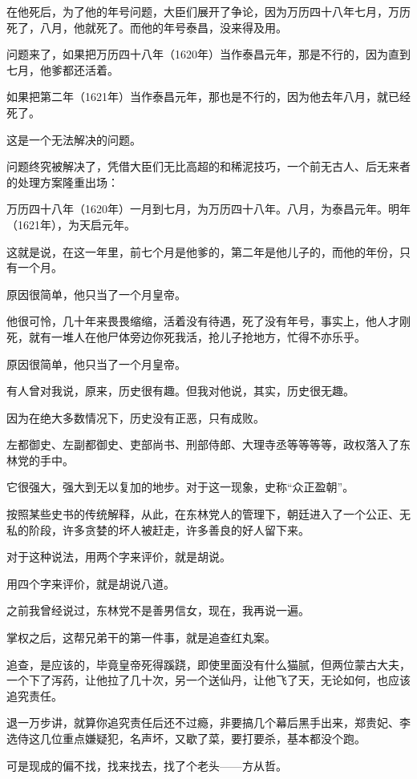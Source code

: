 \begin{multicols}{\theparacolNo}
在他死后，为了他的年号问题，大臣们展开了争论，因为万历四十八年七月，万历死了，八月，他就死了。而他的年号泰昌，没来得及用。

问题来了，如果把万历四十八年（1620年）当作泰昌元年，那是不行的，因为直到七月，他爹都还活着。

如果把第二年（1621年）当作泰昌元年，那也是不行的，因为他去年八月，就已经死了。

这是一个无法解决的问题。

问题终究被解决了，凭借大臣们无比高超的和稀泥技巧，一个前无古人、后无来者的处理方案隆重出场：

万历四十八年（1620年）一月到七月，为万历四十八年。八月，为泰昌元年。明年（1621年），为天启元年。

这就是说，在这一年里，前七个月是他爹的，第二年是他儿子的，而他的年份，只有一个月。

原因很简单，他只当了一个月皇帝。

他很可怜，几十年来畏畏缩缩，活着没有待遇，死了没有年号，事实上，他人才刚死，就有一堆人在他尸体旁边你死我活，抢儿子抢地方，忙得不亦乐乎。

原因很简单，他只当了一个月皇帝。

有人曾对我说，原来，历史很有趣。但我对他说，其实，历史很无趣。

因为在绝大多数情况下，历史没有正恶，只有成败。

左都御史、左副都御史、吏部尚书、刑部侍郎、大理寺丞等等等等，政权落入了东林党的手中。

它很强大，强大到无以复加的地步。对于这一现象，史称“众正盈朝”。

按照某些史书的传统解释，从此，在东林党人的管理下，朝廷进入了一个公正、无私的阶段，许多贪婪的坏人被赶走，许多善良的好人留下来。

对于这种说法，用两个字来评价，就是胡说。

用四个字来评价，就是胡说八道。

之前我曾经说过，东林党不是善男信女，现在，我再说一遍。

掌权之后，这帮兄弟干的第一件事，就是追查红丸案。

追查，是应该的，毕竟皇帝死得蹊跷，即使里面没有什么猫腻，但两位蒙古大夫，一个下了泻药，让他拉了几十次，另一个送仙丹，让他飞了天，无论如何，也应该追究责任。

退一万步讲，就算你追究责任后还不过瘾，非要搞几个幕后黑手出来，郑贵妃、李选侍这几位重点嫌疑犯，名声坏，又歇了菜，要打要杀，基本都没个跑。

可是现成的偏不找，找来找去，找了个老头——方从哲。


\end{multicols}
